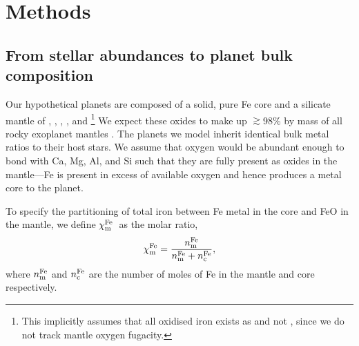 \documentclass[fleqn,usenatbib]{mnras}
\newcommand{\coreeff}{$\chi^{\rm Fe}_{\rm m}$}
\begin{document}
\section{Methods}

\subsection{From stellar abundances to planet bulk composition}\label{sec:methods_comp}

Our hypothetical planets are composed of a solid, pure Fe core and a silicate mantle of , , , , and \footnote{This implicitly assumes that all oxidised iron exists as  and not , since we do not track mantle oxygen fugacity.} We expect these oxides to make up $\gtrsim$98\% by mass of all rocky exoplanet mantles \citep{putirka_composition_2019}. The planets we model inherit identical bulk metal ratios to their host stars. We assume that oxygen would be abundant enough to bond with Ca, Mg, Al, and Si such that they are fully present as oxides in the mantle---Fe is present in excess of available oxygen and hence produces a metal core to the planet. 

To specify the partitioning of total iron between Fe metal in the core and FeO in the mantle, we define \coreeff~as the molar ratio,
\begin{equation}\label{eq:core_eff}
    \chi^{\rm Fe}_{\rm m} = \frac{n_{\rm m}^{\rm Fe}}{n_{\rm m}^{\rm Fe} + n_{\rm c}^{\rm Fe}},
\end{equation}
where $n_{\rm m}^{\rm Fe}$ and $n_{\rm c}^{\rm Fe}$ are the number of moles of Fe in the mantle and core respectively.
\end{document}
